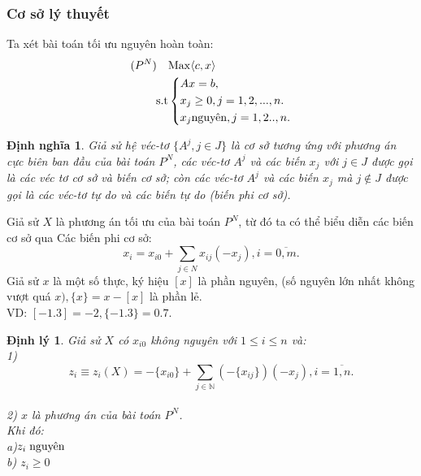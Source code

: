 \documentclass[12pt,a4paper]{report}
\newtheorem{dn}{Định nghĩa}[chapter]
\newtheorem{dl}{Định lý}[chapter]
\begin{document}
\subsubsection{Cơ sở lý thuyết}
Ta xét bài toán tối ưu nguyên hoàn toàn:\\
\begin{equation}\label{Gomory1}
     \begin{split}
      (P^N) \quad    & {\rm{Max}} \langle c,x \rangle\\
          \rm{s.t} &\left\{\begin{split}
            & Ax= b,\\
           & x_j \ge 0, j=1,2,...,n.\\
            & x_j \text{nguyên}, j=1,2..,n.\\
           \end{split}\right.
       \end{split}
   \end{equation}
   \begin{dn}
     Giả  sử hệ véc-tơ $\{A^j,j\in J\}$ là cơ sở tương ứng với phương án cực biên ban đầu của bài toán $P^N$, các véc-tơ $A^j$ và các biến $x_j$ với $j\in J$ được gọi là các véc tơ cơ sở và biến cơ sở; còn các véc-tơ $A^j$ và các biến $x_j$ mà $j \notin J$ được gọi là các véc-tơ tự do và các biến tự do (biến phi cơ sở).\\  
   \end{dn}
    Giả sử $X$ là phương án  tối ưu của bài toán $P^N$, từ đó ta có thể biểu diễn các biến cơ sở qua Các biến phi cơ sở:\\
   \begin{equation}\label{2.4}
       x_{i}=x_{i0} + \sum_{j \in N} x_{ij}(-x_j), i=\overline{0,m}.
   \end{equation}
    Giả sử $x$ là một số thực, ký hiệu $[x]$ là phần nguyên, (số nguyên lớn nhất không vượt quá $x), \{x\}=x-[x]$ là phần lẻ.\\
    VD: $[-1.3]=-2, \{-1.3\}=0.7$.\\
    \begin{dl}
        Giả sử $X$ có $x_{i0}$ không nguyên với $1\le i\le n$ và:\\
        1)\begin{equation}\label{2.5}
            z_i\equiv z_i(X)= -\{x_{i0}\} + \sum_{j \in \mathbb {N} }(-\{x_{ij}\})(-x_{j}), i=\overline{1,n}.
        \end{equation} \\
        2) $x$ là phương án của bài toán $P^N$.\\
        Khi đó:\\
        a)$z_i \hspace{0.1cm} \text{nguyên}$\\
        b) $z_i \ge 0$ 
        \end{dl}
\end{document}
